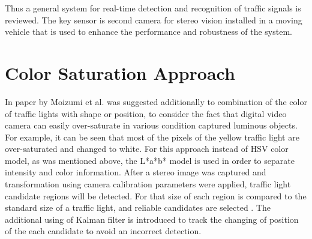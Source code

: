 \documentclass[letterpaper, 10 pt, conference]{ieeeconf} %
\begin{document}
Thus a general system for real-time detection and recognition of traffic signals is reviewed. The key sensor is second camera for stereo vision installed in a moving vehicle that is used to enhance the performance and robustness of the system. 


\section{Color Saturation Approach}
In paper by Moizumi et al. \cite{c3} was suggested additionally to combination of the color of traffic lights with shape or position, to consider the fact that digital video camera can easily over-saturate in various condition captured luminous objects. For example, it can be seen that most of the pixels of the yellow traffic light are over-saturated and changed to white. For this approach instead of HSV color model, as was mentioned above, the L*a*b* model is used in order to separate intensity and color information. After a stereo image was captured and transformation using camera calibration parameters were applied, traffic light candidate regions will be detected. For that size of each region is compared to the standard size of a traffic light, and reliable candidates are selected \cite{c3}. The additional using of Kalman filter is introduced to track the changing of position of the each candidate to avoid an incorrect detection. 
\end{document}
